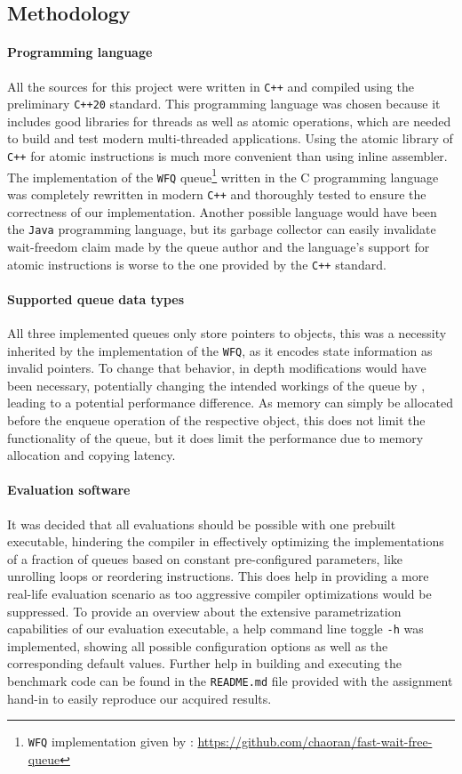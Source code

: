 \documentclass{article}
\newcommand{\WFQ}{\texttt{WFQ}}
\begin{document}
\subsection{Methodology\label{sec:eval-methodology}}
\paragraph{Programming language}
All the sources for this project were written in \texttt{C++} and compiled using the preliminary \texttt{C++20} standard. This programming language was chosen because it includes good libraries for threads as well as atomic operations, which are needed to build and test modern multi-threaded applications. Using the atomic library of \texttt{C++} for atomic instructions is much more convenient than using inline assembler. The implementation of the \WFQ{} queue\footnote{\WFQ{} implementation given by \citeauthor{WFQ}: \url{https://github.com/chaoran/fast-wait-free-queue}} written in the C programming language was completely rewritten in modern \texttt{C++} and thoroughly tested to ensure the correctness of our implementation. Another possible language would have been the \texttt{Java} programming language, but its garbage collector can easily invalidate wait-freedom claim made by the queue author and the language's support for atomic instructions is worse to the one provided by the \texttt{C++} standard. 
\paragraph{Supported queue data types} All three implemented queues only store pointers to objects, this was a necessity inherited by the implementation of the \WFQ, as it encodes state information as invalid pointers. To change that behavior, in depth modifications would have been necessary, potentially changing the intended workings of the queue by \citeauthor{WFQ}, leading to a potential performance difference. As memory can simply be allocated before the enqueue operation of the respective object, this does not limit the functionality of the queue, but it does limit the performance due to memory allocation and copying latency.
\paragraph{Evaluation software}
It was decided that all evaluations should be possible with one prebuilt executable, hindering the compiler in effectively optimizing the implementations of a fraction of queues based on constant pre-configured parameters, like unrolling loops or reordering instructions. This does help in providing a more real-life evaluation scenario as too aggressive compiler optimizations would be suppressed. To provide an overview about the extensive parametrization capabilities of our evaluation executable, a help command line toggle \texttt{-h} was implemented, showing all possible configuration options as well as the corresponding default values. Further help in building and executing the benchmark code can be found in the \texttt{README.md} file provided with the assignment hand-in to easily reproduce our acquired results.
\end{document}
